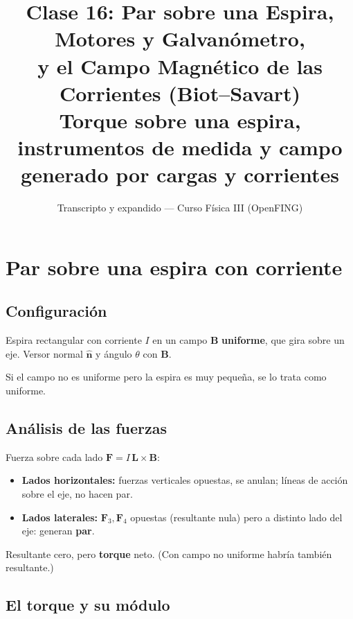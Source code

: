 \documentclass[12pt,a4paper]{article}
\title{\textbf{Clase 16: Par sobre una Espira, Motores y Galvanómetro, \\
        y el Campo Magnético de las Corrientes (Biot--Savart)}\\[0.3em]
        \large{Torque sobre una espira, instrumentos de medida y campo
              generado por cargas y corrientes}}
\author{Transcripto y expandido --- Curso Física III (OpenFING)}
\date{}
\begin{document}
\maketitle
\thispagestyle{empty}
\newpage

\tableofcontents
\newpage

\section{Par sobre una espira con corriente}

\subsection{Configuración}

Espira rectangular con corriente $I$ en un campo $\mathbf{B}$
\textbf{uniforme}, que gira sobre un eje. Versor normal $\hat{\mathbf{n}}$
y ángulo $\theta$ con $\mathbf{B}$.

\begin{notebox}
  Si el campo no es uniforme pero la espira es muy pequeña, se lo trata
  como uniforme.
\end{notebox}

\subsection{Análisis de las fuerzas}

Fuerza sobre cada lado $\mathbf{F} = I\,\mathbf{L}\times\mathbf{B}$:
\begin{itemize}[nosep]
  \item \textbf{Lados horizontales:} fuerzas verticales opuestas, se
        anulan; líneas de acción sobre el eje, no hacen par.
  \item \textbf{Lados laterales:} $\mathbf{F}_3, \mathbf{F}_4$ opuestas
        (resultante nula) pero a distinto lado del eje: generan
        \textbf{par}.
\end{itemize}
Resultante cero, pero \textbf{torque} neto. (Con campo no uniforme
habría también resultante.)



\subsection{El torque y su módulo}
\end{document}
